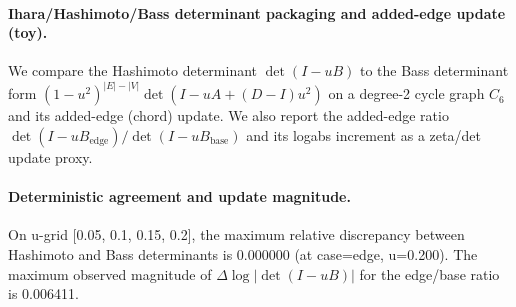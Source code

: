 \paragraph{Ihara/Hashimoto/Bass determinant packaging and added-edge update (toy).} \AuditTag We compare the Hashimoto determinant $\det(I-uB)$ to the Bass determinant form $(1-u^2)^{|E|-|V|}\det(I-uA+(D-I)u^2)$ on a degree-2 cycle graph $C_6$ and its added-edge (chord) update. We also report the added-edge ratio $\det(I-uB_{\mathrm{edge}})/\det(I-uB_{\mathrm{base}})$ and its logabs increment as a zeta/det update proxy.
\paragraph{Deterministic agreement and update magnitude.} \AuditTag On u-grid [0.05, 0.1, 0.15, 0.2], the maximum relative discrepancy between Hashimoto and Bass determinants is 0.000000 (at case=edge, u=0.200). The maximum observed magnitude of $\Delta\log|\det(I-uB)|$ for the edge/base ratio is 0.006411.